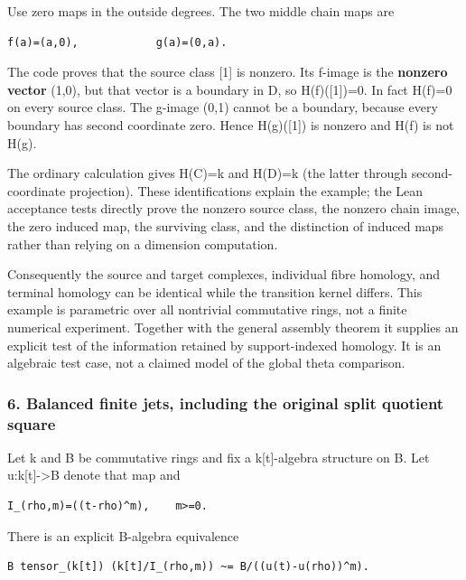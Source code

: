 Use zero maps in the outside degrees. The two middle chain maps are

\begin{verbatim}
f(a)=(a,0),            g(a)=(0,a).
\end{verbatim}

The code proves that the source class {[}1{]} is nonzero. Its f-image is the \textbf{nonzero vector}
(1,0), but that vector is a boundary in D, so H(f)({[}1{]})=0. In fact H(f)=0 on every source class.
The g-image (0,1) cannot be a boundary, because every boundary has second coordinate zero. Hence
H(g)({[}1{]}) is nonzero and H(f) is not H(g).

The ordinary calculation gives H(C)=k and H(D)=k (the latter through second-coordinate projection).
These identifications explain the example; the Lean acceptance tests directly prove the nonzero
source class, the nonzero chain image, the zero induced map, the surviving class, and the
distinction of induced maps rather than relying on a dimension computation.

Consequently the source and target complexes, individual fibre homology, and terminal homology can
be identical while the transition kernel differs. This example is parametric over all nontrivial
commutative rings, not a finite numerical experiment. Together with the general assembly theorem it
supplies an explicit test of the information retained by support-indexed homology. It is an
algebraic test case, not a claimed model of the global theta comparison.

\subsubsection{6. Balanced finite jets, including the original split quotient
square}\label{derived_main:balanced-finite-jets-including-the-original-split-quotient-square}

Let k and B be commutative rings and fix a k{[}t{]}-algebra structure on B. Let
u:k{[}t{]}-\textgreater B denote that map and

\begin{verbatim}
I_(rho,m)=((t-rho)^m),    m>=0.
\end{verbatim}

There is an explicit B-algebra equivalence

\begin{verbatim}
B tensor_(k[t]) (k[t]/I_(rho,m)) ~= B/((u(t)-u(rho))^m).
\end{verbatim}

